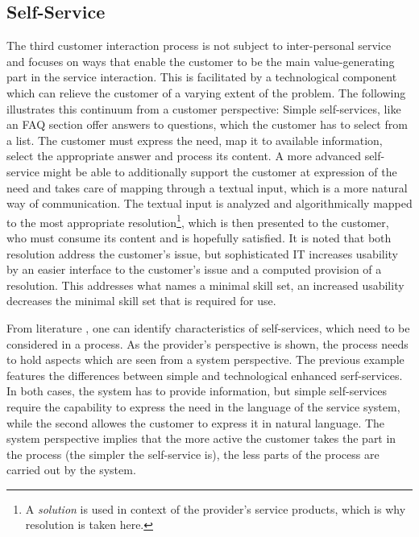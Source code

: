 	 	\subsection{Self-Service}
	 
	 The third customer interaction process is not subject to inter-personal service \citep{Thomas2008self} and focuses on ways that enable the customer to be the main value-generating part in the service interaction. This is facilitated by a technological component which can relieve the customer of a varying extent of the problem. The following illustrates this continuum from a customer perspective: Simple self-services, like an \acrshort{FAQ} section offer answers to questions, which the customer has to select from a list. The customer must express the need, map it to available information, select the appropriate answer and process its content. A more advanced self-service might be able to additionally support the customer at expression of the need and takes care of mapping through a textual input, which is a more natural way of communication. The textual input is analyzed and algorithmically mapped to the most appropriate resolution\footnote{A \textit{solution} is used in context of the provider's service products, which is why resolution is taken here.}, which is then presented to the customer, who must consume its content and is hopefully satisfied. It is noted that both resolution address the customer's issue, but sophisticated \acrshort{IT} increases usability by an easier interface to the customer's issue and a computed provision of a resolution. This addresses what \cite{Thomas2008self} names a minimal skill set, \viz an increased usability decreases the minimal skill set that is required for use. 
	 
	 From literature \citep{meuter2000self, Thomas2008self, Thomas:2009}, one can identify characteristics of self-services, which need to be considered in a process. As the provider's perspective is shown, the process needs to hold aspects which are seen from a system perspective. The previous example features the differences between simple and technological enhanced serf-services. In both cases, the system has to provide information, but simple self-services require the capability to express the need in the language of the service system, while the second allowes the customer to express it in natural language. The system perspective implies that the more active the customer takes the part in the process (\ie the simpler the self-service is), the less parts of the process are carried out by the system. 
	 
